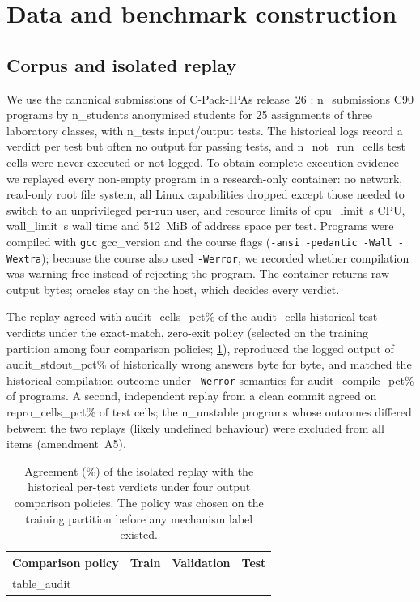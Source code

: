\section{Data and benchmark construction}\label{sec:data}

\subsection{Corpus and isolated replay}\label{sec:replay}
We use the canonical submissions of C-Pack-IPAs release~26 \citep{orvalho2024cpack}: {{n_submissions}} C90 programs by {{n_students}} anonymised students for 25 assignments of three laboratory classes, with {{n_tests}} input/output tests. The historical logs record a verdict per test but often no output for passing tests, and {{n_not_run_cells}} test cells were never executed or not logged. To obtain complete execution evidence we replayed every non-empty program in a research-only container: no network, read-only root file system, all Linux capabilities dropped except those needed to switch to an unprivileged per-run user, and resource limits of {{cpu_limit}}~s CPU, {{wall_limit}}~s wall time and 512~MiB of address space per test. Programs were compiled with \texttt{gcc} {{gcc_version}} and the course flags (\texttt{-ansi -pedantic -Wall -Wextra}); because the course also used \texttt{-Werror}, we recorded whether compilation was warning-free instead of rejecting the program. The container returns raw output bytes; oracles stay on the host, which decides every verdict.

The replay agreed with {{audit_cells_pct}}\% of the {{audit_cells}} historical test verdicts under the exact-match, zero-exit policy (selected on the training partition among four comparison policies; \cref{tab:audit}), reproduced the logged output of {{audit_stdout_pct}}\% of historically wrong answers byte for byte, and matched the historical compilation outcome under \texttt{-Werror} semantics for {{audit_compile_pct}}\% of programs. A second, independent replay from a clean commit agreed on {{repro_cells_pct}}\% of test cells; the {{n_unstable}} programs whose outcomes differed between the two replays (likely undefined behaviour) were excluded from all items (amendment~A5).

\begin{table}[t]
\centering
\caption{Agreement (\%) of the isolated replay with the historical per-test verdicts under four output comparison policies. The policy was chosen on the training partition before any mechanism label existed.}\label{tab:audit}
\small
\begin{tabular}{lrrr}
\toprule
Comparison policy & Train & Validation & Test \\
\midrule
{{table_audit}}
\bottomrule
\end{tabular}
\end{table}

